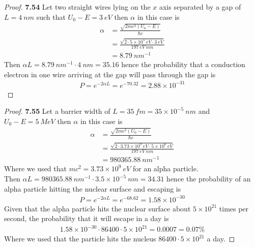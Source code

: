 \documentclass[11pt]{article}
\newcommand{\sci}[1]{\times 10^{#1}}
\theoremstyle{definition}
\begin{document}
\cleardoublepage
\begin{proof}{\textbf{7.54}}
Let two straight wires lying on the $x$ axis separated by a gap of $L = 4~nm$
such that $U_0 - E = 3~eV$ then $\alpha$ in this case is 
\begin{align*}
    \alpha &= \frac{\sqrt{2mc^2(U_0 - E)}}{\hbar c}\\
    &= \frac{\sqrt{2 \cdot 5\sci{5}~eV\cdot 3~eV}}{197~eV~nm}\\
    &= 8.79~nm^{-1}
\end{align*}
Then $\alpha L = 8.79~nm^{-1} \cdot 4~nm = 35.16$ hence the probability that a
conduction electron in one wire arriving at the gap will pass through the gap is
\begin{align*}
    P = e^{-2\alpha L} = e^{-70.32} = 2.88 \sci{-31}
\end{align*}
\end{proof}
\begin{proof}{\textbf{7.55}}
Let a barrier width of $L = 35~fm = 35 \sci{-5}~nm$ and $U_0 - E = 5~MeV$ then
$\alpha$ in this case is
\begin{align*}
    \alpha &= \frac{\sqrt{2mc^2(U_0 - E)}}{\hbar c}\\
    &= \frac{\sqrt{2 \cdot 3.73\sci{9}~eV\cdot 5\sci{6}~eV}}{197~eV~nm}\\
    &= 980365.88~nm^{-1}
\end{align*}
Where we used that $mc^2 = 3.73\sci{9}~eV$ for an alpha particle.
\\
Then $\alpha L = 980365.88~nm^{-1} \cdot 3.5\sci{-5}~nm = 34.31$ hence
the probability of an alpha particle hitting the nuclear surface and escaping
is
\begin{align*}
    P = e^{-2\alpha L} = e^{-68.62} = 1.58 \sci{-30}
\end{align*}
Given that the alpha particle hits the nuclear surface about $5\sci{21}$ times
per second, the probability that it will escape in a day is
\begin{align*}
    1.58 \sci{-30} \cdot 86400 \cdot 5\sci{21} = 0.0007 = 0.07 \%
\end{align*}
Where we used that the particle hits the nucleus $86400 \cdot 5\sci{21}$ a day.
\end{proof}
\end{document}
